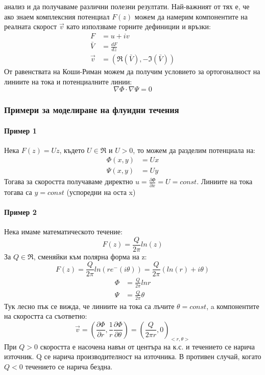 анализ и да получаваме различни полезни резултати. Най-важният от тях е, че ако знаем комплексния потенциал $F(z)$ можем да намерим компонентите на реалната
скорост $\vec{v}$ като използваме горните дефиниции и връзки:
\begin{align*}
	F       & = u + i v                       \\
	\bar{V} & = \frac{d F}{d z}               \\
	\vec{v} & = (\Re(\bar{V}), -\Im(\bar{V}))
\end{align*}
От равенствата на Коши-Риман можем да получим условието за ортогоналност на линиите на тока и потенциалните линии:
\begin{equation}
	\nabla \Phi \cdot \nabla \Psi = 0
\end{equation}

\subsubsection{Примери за моделиране на флуидни течения}
\paragraph{Пример 1}
Нека $F(z) = U z$, където $U \in \Re$ и $U > 0$, то можем да разделим потенциала на:
\begin{align*}
	\Phi(x,y) & = U x \\
	\Psi(x,y) & = U y
\end{align*}
Тогава за скоростта получаваме директно $u = \frac{\partial \Phi}{\partial x} = U = const$.
Линиите на тока тогава са $y = const$ (успоредни на оста x)
\paragraph{Пример 2}
Нека имаме математическото течение:
\begin{equation}
	F(z) = \frac{Q}{2 \pi} ln(z)
\end{equation}
За $Q \in \Re$, сменяйки към полярна форма на z:
\begin{equation*}
	F(z) = \frac{Q}{2 \pi} ln(r e^-(i \theta))  = \frac{Q}{2 \pi}(ln(r) + i \theta)
\end{equation*}
\begin{align*}
	\Phi & = \frac{Q}{2\pi} ln r   \\
	\Psi & = \frac{Q}{2\pi} \theta
\end{align*}
Тук лесно пък се вижда, че линиите на тока са лъчите $\theta = const$, a компонентите на скоростта са съответно:
\begin{equation*}
	\vec{v} = \left(\frac{\partial \Phi}{\partial r},\frac{1}{r}\frac{\partial \Phi}{\partial \theta}\right) = \left(\frac{Q}{2 \pi r}, 0\right)_{<r, \theta>}
\end{equation*}
При $Q>0$ скоростта е насочена навън от центъра на к.с. и течението се нарича източник. Q се нарича производителност на източника. В противен случай, когато $Q<0$ течението се нарича бездна.
